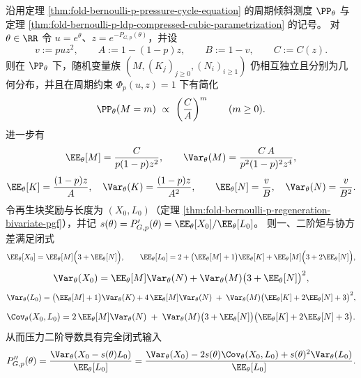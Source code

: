 \begin{proposition}[周期倾斜下再生块二阶矩的闭式输入]\label{prop:fold-bernoulli-p-cycle-tilt-second-moments-closed}
沿用定理 \ref{thm:fold-bernoulli-p-pressure-cycle-equation} 的周期倾斜测度 \(\PP_\theta\) 与定理 \ref{thm:fold-bernoulli-p-ldp-compressed-cubic-parametrization} 的记号。
对 \(\theta\in\RR\) 令 \(u=e^\theta\)、\(z=e^{-P_{G,p}(\theta)}\)，并设
\[
v:=puz^{2},\qquad
A:=1-(1-p)z,\qquad
B:=1-v,\qquad
C:=C(z).
\]
则在 \(\PP_\theta\) 下，随机变量族 \((M,(K_j)_{j\ge 0},(N_i)_{i\ge 1})\) 仍相互独立且分别为几何分布，并且在周期约束 \(\Phi_p(u,z)=1\) 下有简化
\begin{equation}\label{eq:fold-bernoulli-p-cycle-tilt-qM-CoverA}
\PP_\theta(M=m)\ \propto\ \left(\frac{C}{A}\right)^{m}\qquad(m\ge 0).
\end{equation}
进一步有
\[
\EE_\theta[M]=\frac{C}{p(1-p)z^{2}},\qquad
\Var_\theta(M)=\frac{C\,A}{p^{2}(1-p)^{2}z^{4}},
\]
\[
\EE_\theta[K]=\frac{(1-p)z}{A},\quad
\Var_\theta(K)=\frac{(1-p)z}{A^{2}},\qquad
\EE_\theta[N]=\frac{v}{B},\quad
\Var_\theta(N)=\frac{v}{B^{2}}.
\]
令再生块奖励与长度为 \((X_0,L_0)\)（定理 \ref{thm:fold-bernoulli-p-regeneration-bivariate-pgf}），并记
\(
s(\theta)=P'_{G,p}(\theta)=\EE_\theta[X_0]/\EE_\theta[L_0]
\)。
则一、二阶矩与协方差满足闭式
\[
\EE_\theta[X_0]=\EE_\theta[M]\Bigl(3+\EE_\theta[N]\Bigr),
\qquad
\EE_\theta[L_0]=2+\bigl(\EE_\theta[M]+1\bigr)\EE_\theta[K]+\EE_\theta[M]\Bigl(3+2\EE_\theta[N]\Bigr),
\]
\[
\Var_\theta(X_0)=\EE_\theta[M]\Var_\theta(N)+\Var_\theta(M)\bigl(3+\EE_\theta[N]\bigr)^{2},
\]
\[
\Var_\theta(L_0)=\bigl(\EE_\theta[M]+1\bigr)\Var_\theta(K)+4\,\EE_\theta[M]\Var_\theta(N)
\;+\;\Var_\theta(M)\bigl(\EE_\theta[K]+2\EE_\theta[N]+3\bigr)^{2},
\]
\[
\Cov_\theta(X_0,L_0)=2\,\EE_\theta[M]\Var_\theta(N)
\;+\;\Var_\theta(M)\bigl(3+\EE_\theta[N]\bigr)\bigl(\EE_\theta[K]+2\EE_\theta[N]+3\bigr).
\]
从而压力二阶导数具有完全闭式输入
\begin{equation}\label{eq:fold-bernoulli-p-cycle-tilt-second-derivative-variance-expanded}
P''_{G,p}(\theta)
=\frac{\Var_\theta\!\left(X_0-s(\theta)L_0\right)}{\EE_\theta[L_0]}
=\frac{\Var_\theta(X_0)-2s(\theta)\Cov_\theta(X_0,L_0)+s(\theta)^{2}\Var_\theta(L_0)}{\EE_\theta[L_0]}.
\end{equation}
\end{proposition}
